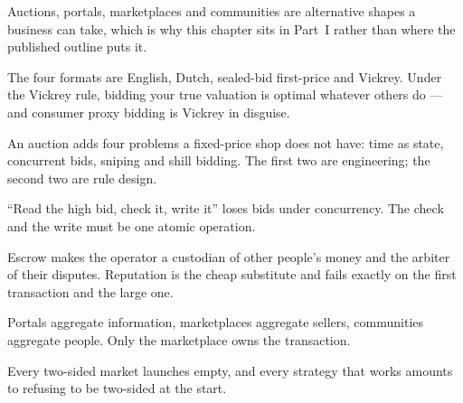 \begin{chaptersummary}
\begin{tight}
  \item Auctions, portals, marketplaces and communities are alternative shapes
        a business can take, which is why this chapter sits in Part~I rather
        than where the published outline puts it.
  \item The four formats are English, Dutch, sealed-bid first-price and
        Vickrey. Under the Vickrey rule, bidding your true valuation is optimal
        whatever others do --- and consumer proxy bidding is Vickrey in
        disguise.
  \item An auction adds four problems a fixed-price shop does not have: time as
        state, concurrent bids, sniping and shill bidding. The first two are
        engineering; the second two are rule design.
  \item ``Read the high bid, check it, write it'' loses bids under concurrency.
        The check and the write must be one atomic operation.
  \item Escrow makes the operator a custodian of other people's money and the
        arbiter of their disputes. Reputation is the cheap substitute and fails
        exactly on the first transaction and the large one.
  \item Portals aggregate information, marketplaces aggregate sellers,
        communities aggregate people. Only the marketplace owns the
        transaction.
  \item Every two-sided market launches empty, and every strategy that works
        amounts to refusing to be two-sided at the start.
\end{tight}
\end{chaptersummary}

